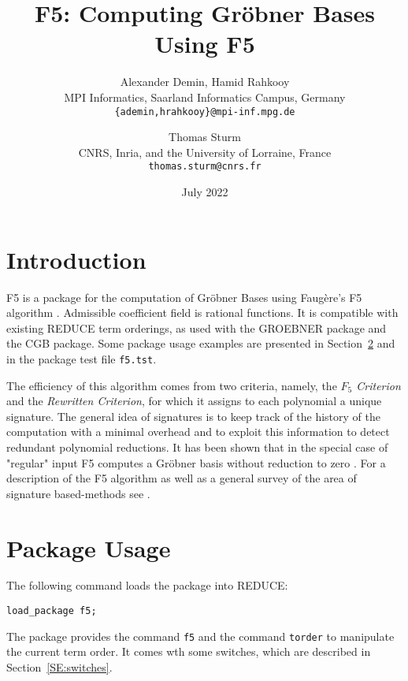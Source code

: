 \documentclass{article}
\newcommand{\grobner}{Gr\"obner}
\newcommand{\faugere}{Faug\`ere}
\newcommand{\code}[1]{\texttt{#1}}
\begin{document}
\title{F5: Computing Gröbner Bases Using F5}

\author{Alexander Demin, Hamid Rahkooy\\
  MPI Informatics, Saarland Informatics Campus, Germany\\
  \texttt{\{ademin,hrahkooy\}@mpi-inf.mpg.de}
  \and
  Thomas Sturm\\
  CNRS, Inria, and the University of Lorraine, France\\
  \texttt{thomas.sturm@cnrs.fr}
}

\date{July 2022}

\maketitle

\section{Introduction}

F5 is a package for the computation of \grobner{} Bases using \faugere{}'s F5 algorithm \cite{f5}.
Admissible coefficient field is rational functions. It is compatible with existing REDUCE term
orderings, as used with the GROEBNER package and the CGB package. Some package usage examples are
presented in Section~\ref{SE:usage} and in the package test file
\code{f5.tst}.

The efficiency of this algorithm comes from two criteria, namely, the \emph{$F_5$ Criterion} and the
\emph{Rewritten Criterion}, for which it assigns to each polynomial a unique signature. The general
idea of signatures is to keep track of the history of the computation with a minimal overhead and to
exploit this information to detect redundant polynomial reductions. It has been shown that in the
special case of "regular" input F5 computes a \grobner{} basis without reduction to zero \cite{f5}.
For a description of the F5 algorithm as well as a general survey of the area of signature
based-methods see \cite{survey}.

\section{Package Usage}\label{SE:usage}

The following command loads the package into REDUCE:
%
\begin{center}
    \code{load\_package f5;}
\end{center}

The package provides the command \code{f5} and the command \code{torder} to manipulate the current
term order. It comes wth some switches, which are described in Section~\ref{SE:switches}.
\end{document}
